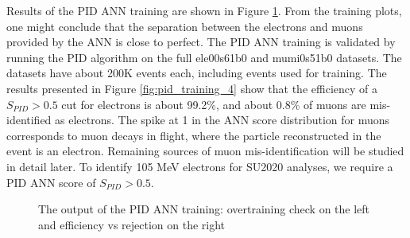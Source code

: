Results of the PID ANN training are shown in Figure \ref{fig:pid_training_3}. 
From the training plots, one might conclude that the separation between the
electrons and muons provided by the ANN is close to perfect. 
{\blue The} PID ANN training is validated by running the PID algorithm on {\blue the} full ele00s61b0 and mumi0s51b0 datasets.
The datasets have about 200K events each, including events used for training.
{\blue The r}esults presented in Figure \ref{fig:pid_training_4} show that the efficiency of 
{\blue a} $S_{PID} > 0.5$ cut 
for electrons is about 99.2\%, and about 0.8\% of muons are mis-identified as electrons. The spike at 1
in the ANN score distribution for muons corresponds to muon decays in flight, where the particle
reconstructed in the event is an electron. Remaining sources of muon mis-identification will be 
studied in detail later.
{\blue To identify 105 MeV electrons for SU2020 analyses, we require a PID ANN score of $S_{PID} > 0.5$.}


\begin{figure}[H]
\hspace{-0.6in}
  \caption{
    \label{fig:pid_training_3}
    {\blue The} output of the PID ANN training: overtraining check on the left and efficiency vs rejection 
    on the right
  }
\end{figure}

